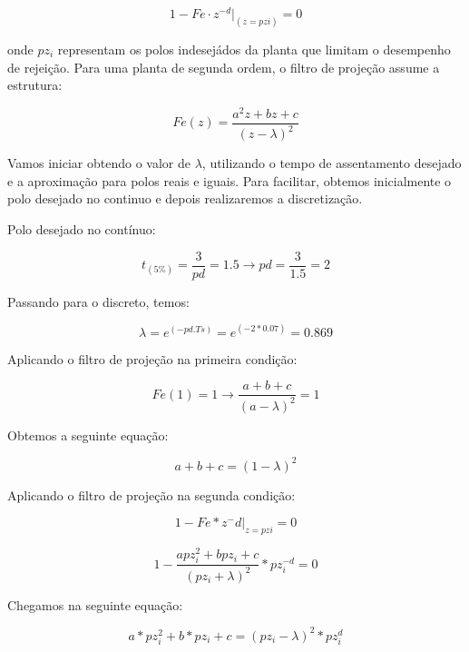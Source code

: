 \documentclass[a4paper,12pt]{article}
\begin{document}
\begin{equation}
1 - Fe \cdot z^{-d} |_{(z=pzi)} = 0 
\end{equation}

onde $pz_i$ representam os polos indesejádos da planta que limitam o desempenho de rejeição. Para uma planta de segunda ordem, o filtro de projeção assume a estrutura:

\begin{equation}
Fe(z) = \frac{a^2z+bz+c}{(z-\lambda)^2}
\end{equation}


Vamos iniciar obtendo o valor de $\lambda$, utilizando o tempo de assentamento desejado e a aproximação para polos reais e iguais. Para facilitar, obtemos inicialmente o polo desejado  no continuo e depois realizaremos a discretização.


Polo desejado no contínuo:

\begin{equation}
t_{(5\%)} = \frac{3}{pd} = 1.5 \xrightarrow{} pd = \frac{3}{1.5} = 2
\end{equation}

Passando para o discreto, temos:

\begin{equation}
\lambda = e^{(-pd.Ts)} = e^{(-2*0.07)} = 0.869
\end{equation}

Aplicando o filtro de projeção na primeira condição:

\begin{equation}
Fe(1) = 1 \rightarrow \frac{a+b+c}{(a-\lambda)^2} = 1
\end{equation}

Obtemos a seguinte equação:

\begin{equation}
a+b+c = (1-\lambda)^2
\end{equation}

Aplicando o filtro de projeção na segunda condição:

\begin{equation}
1-Fe * z ^-d |_{z=pzi} = 0
\end{equation}

\begin{equation}
1-\frac{apz^2_i + bpz_i + c}{(pz_i + \lambda)^2} * pz^{-d}_i = 0
\end{equation}

Chegamos na seguinte equação:

\begin{equation}
a * pz^2_i + b*pz_i + c = (pz_i - \lambda)^2 * pz^d_i
\end{equation}
\end{document}

